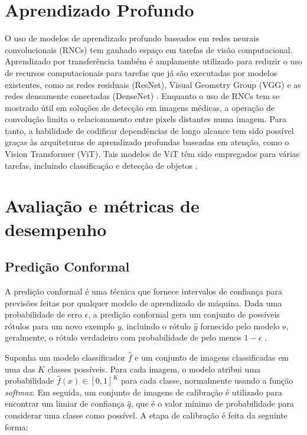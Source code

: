 \section{Aprendizado Profundo}\label{sec:aprendizado-profundo}

O uso de modelos de aprendizado profundo baseados em redes neurais convolucionais (RNCs) tem ganhado espaço em tarefas de visão computacional. Aprendizado por transferência também é amplamente utilizado para reduzir o uso de recursos computacionais para tarefas que já são executadas por modelos existentes, como as redes residuais (ResNet), Visual Geometry Group (VGG) e as redes densamente conectadas (DenseNet) \cite{Tariq2023}. Enquanto o uso de RNCs tem se mostrado útil em soluções de detecção em imagens médicas, a operação de convolução limita o relacionamento entre pixels distantes numa imagem. Para tanto, a habilidade de codificar dependências de longo alcance tem sido possível graças às arquiteturas de aprendizado profundas baseadas em atenção, como o Vision Transformer (ViT). Tais modelos de ViT têm sido empregados para várias tarefas, incluindo classificação e detecção de objetos \cite{Shamshad2023}.


\section{Avaliação e métricas de desempenho} \label{sec:avaliacao-metricas}

\subsection{Predição Conformal}

A predição conformal é uma técnica que fornece intervalos de confiança para previsões feitas por qualquer modelo de aprendizado de máquina. Dada uma probabilidade de erro $\epsilon$, a predição conformal gera um conjunto de possíveis rótulos para um novo exemplo $y$, incluindo o rótulo $\hat{y}$ fornecido pelo modelo e, geralmente, o rótulo verdadeiro com probabilidade de pelo menos $1 - \epsilon$ \citep{angelopoulos2021gentle}.

Suponha um modelo classificador $\hat{f}$ e um conjunto de imagens classificadas em uma das $K$ classes possíveis. Para cada imagem, o modelo atribui uma probabilidade $\hat{f}(x) \in [0,1]^K$ para cada classe, normalmente usando a função \textit{softmax}. Em seguida, um conjunto de imagens de calibração é utilizado para encontrar um limiar de confiança $\hat{q}$, que é o valor mínimo de probabilidade para considerar uma classe como possível. A etapa de calibração é feita da seguinte forma:

